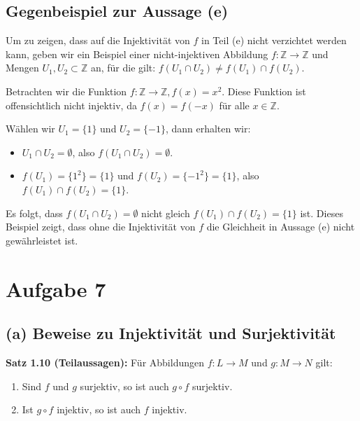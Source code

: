 \documentclass[12pt]{article}
\begin{document}
\subsection*{Gegenbeispiel zur Aussage (e)}

Um zu zeigen, dass auf die Injektivität von \( f \) in Teil (e) nicht verzichtet werden kann, geben wir ein Beispiel einer nicht-injektiven Abbildung \( f : \mathbb{Z} \rightarrow \mathbb{Z} \) und Mengen \( U_1, U_2 \subset \mathbb{Z} \) an, für die gilt: \( f(U_1 \cap U_2) \neq f(U_1) \cap f(U_2) \).

Betrachten wir die Funktion \( f : \mathbb{Z} \rightarrow \mathbb{Z}, f(x) = x^2 \). Diese Funktion ist offensichtlich nicht injektiv, da \( f(x) = f(-x) \) für alle \( x \in \mathbb{Z} \).

Wählen wir \( U_1 = \{1\} \) und \( U_2 = \{-1\} \), dann erhalten wir:

\begin{itemize}
	\item \( U_1 \cap U_2 = \emptyset \), also \( f(U_1 \cap U_2) = \emptyset \).
	\item \( f(U_1) = \{1^2\} = \{1\} \) und \( f(U_2) = \{-1^2\} = \{1\} \), also \( f(U_1) \cap f(U_2) = \{1\} \).
\end{itemize}

Es folgt, dass \( f(U_1 \cap U_2) = \emptyset \) nicht gleich \( f(U_1) \cap f(U_2) = \{1\} \) ist. Dieses Beispiel zeigt, dass ohne die Injektivität von \( f \) die Gleichheit in Aussage (e) nicht gewährleistet ist.

\section*{Aufgabe 7}

\subsection*{(a) Beweise zu Injektivität und Surjektivität}

\textbf{Satz 1.10 (Teilaussagen):} Für Abbildungen \( f : L \rightarrow M \) und \( g : M \rightarrow N \) gilt:

\begin{enumerate}
	\item Sind \( f \) und \( g \) surjektiv, so ist auch \( g \circ f \) surjektiv.
	\item Ist \( g \circ f \) injektiv, so ist auch \( f \) injektiv.
\end{enumerate}
\end{document}
